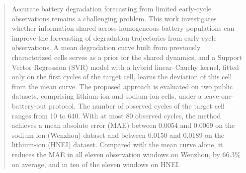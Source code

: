 \documentclass[conference]{IEEEtran}
\begin{document}
\begin{abstract}

Accurate battery degradation forecasting from limited early-cycle observations remains a challenging problem. This work investigates whether information shared across homogeneous battery populations can improve the forecasting of degradation trajectories from early-cycle observations. A mean degradation curve built from previously characterized cells serves as a prior for the shared dynamics, and a Support Vector Regression (SVR) model with a hybrid linear--Cauchy kernel, fitted only on the first cycles of the target cell, learns the deviation of this cell from the mean curve. The proposed approach is evaluated on two public datasets, comprising lithium-ion and sodium-ion cells, under a leave-one-battery-out protocol. The number of observed cycles of the target cell ranges from 10 to 640. With at most 80 observed cycles, the method achieves a mean absolute error (MAE) between 0.0054 and 0.0069 on the sodium-ion (Wenzhou) dataset and between 0.0150 and 0.0189 on the lithium-ion (HNEI) dataset. Compared with the mean curve alone, it reduces the MAE in all eleven observation windows on Wenzhou, by 66.3\% on average, and in ten of the eleven windows on HNEI.

\end{abstract}
\end{document}
